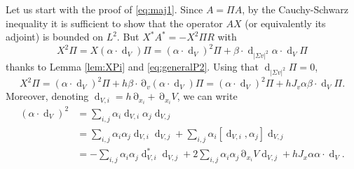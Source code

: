 \documentclass[12pt]{amsart}
\renewcommand{\d}{\operatorname{d}}
\numberwithin{equation}{section}
\numberwithin{figure}{section}
\DeclareMathOperator{\p}{\partial}
\begin{document}
Let us start with the proof of \eqref{eq:maj1}. Since $A=\Pi A$, by the Cauchy-Schwarz inequality it is sufficient to show that the operator $AX$ (or equivalently its adjoint) is bounded on $L^2$. But $X^*A^* = -X^2\Pi R$ with
\begin{equation*}
X^2\Pi = X(\alpha\cdot\d_V)\Pi = (\alpha\cdot\d_V)^2\Pi + \beta\cdot\d_{|\Sigma v|^2}\alpha\cdot\d_V\Pi
\end{equation*}
thanks to Lemma \ref{lem:XPi} and \eqref{eq:generalP2}. Using that $\d_{|\Sigma v|^2}\Pi = 0$,
\begin{equation}\label{eq:X2Pi}
X^2\Pi = (\alpha\cdot\d_V)^2\Pi + h\beta\cdot\p_v(\alpha\cdot\d_V)\Pi = (\alpha\cdot\d_V)^2\Pi + hJ_v\alpha\beta\cdot\d_V\Pi.
\end{equation}
Moreover, denoting $\d_{V,i} = h\p_{x_i} + \p_{x_i}V$, we can write
\begin{equation}\label{eq:alphadv2}
\begin{aligned}
    (\alpha\cdot\d_V)^2 &= \sum_{i,j}\alpha_i\d_{V,i}\alpha_j\d_{V,j}\\
    &= \sum_{i,j}\alpha_i\alpha_j\d_{V,i}\d_{V,j} + \sum_{i,j}\alpha_i[\d_{V,i},\alpha_j]\d_{V,j}\\
    &= -\sum_{i,j}\alpha_i\alpha_j\d_{V,i}^*\d_{V,j} + 2\sum_{i,j}\alpha_i\alpha_j\p_{x_i}V\d_{V,j} + hJ_x\alpha\alpha\cdot\d_V.
\end{aligned}
\end{equation}
\end{document}
